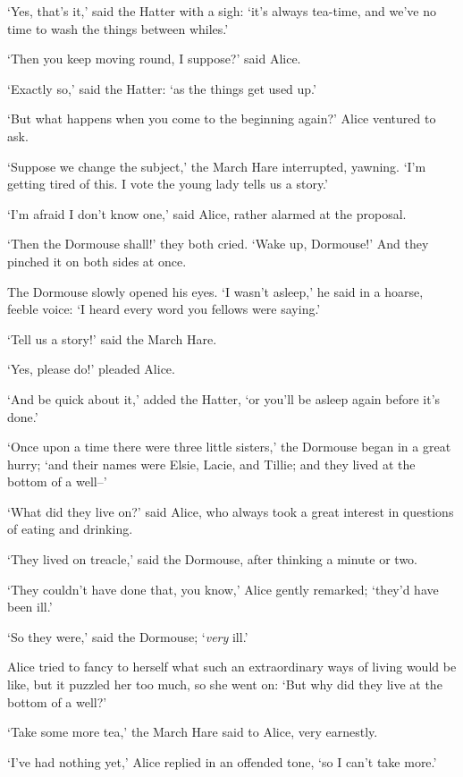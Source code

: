   `Yes, that's it,' said the Hatter with a sigh:  `it's always
tea-time, and we've no time to wash the things between whiles.'

  `Then you keep moving round, I suppose?' said Alice.

  `Exactly so,' said the Hatter:  `as the things get used up.'

  `But what happens when you come to the beginning again?' Alice
ventured to ask.

  `Suppose we change the subject,' the March Hare interrupted,
yawning.  `I'm getting tired of this.  I vote the young lady
tells us a story.'

  `I'm afraid I don't know one,' said Alice, rather alarmed at
the proposal.

  `Then the Dormouse shall!' they both cried.  `Wake up,
Dormouse!'  And they pinched it on both sides at once.

  The Dormouse slowly opened his eyes.  `I wasn't asleep,' he
said in a hoarse, feeble voice:  `I heard every word you fellows
were saying.'

  `Tell us a story!' said the March Hare.

  `Yes, please do!' pleaded Alice.

  `And be quick about it,' added the Hatter, `or you'll be asleep
again before it's done.'

  `Once upon a time there were three little sisters,' the
Dormouse began in a great hurry; `and their names were Elsie,
Lacie, and Tillie; and they lived at the bottom of a well--'

  `What did they live on?' said Alice, who always took a great
interest in questions of eating and drinking.

  `They lived on treacle,' said the Dormouse, after thinking a
minute or two.

  `They couldn't have done that, you know,' Alice gently
remarked; `they'd have been ill.'

  `So they were,' said the Dormouse; `{\it very} ill.'

  Alice tried to fancy to herself what such an extraordinary ways
of living would be like, but it puzzled her too much, so she went
on:  `But why did they live at the bottom of a well?'

  `Take some more tea,' the March Hare said to Alice, very
earnestly.

  `I've had nothing yet,' Alice replied in an offended tone, `so
I can't take more.'

